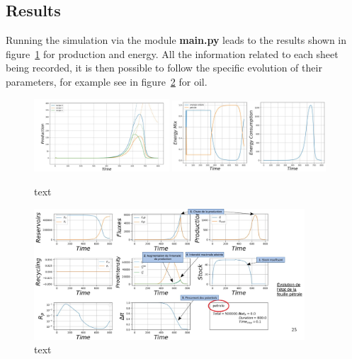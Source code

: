 \documentclass[12pt,a4paper]{article}%
\begin{document}

\subsection{Results}

Running the simulation via the module \textbf{main.py} leads to the results shown in figure~\ref{fig:ResSimulProd} for production and energy. All the information related to each sheet being recorded, it is then possible to follow the specific evolution of their parameters, for example see in figure~\ref{fig:ResSimulOil} for oil.



\begin{figure}[h]
	\centering
	\includegraphics[width=0.45\textwidth]{figures/ResultatSimul.jpg}
	\includegraphics[width=0.51\textwidth]{figures/ResultatSimulE.png}
	\caption{text}
	\label{fig:ResSimulProd}
\end{figure}



\begin{figure}[h]
	\centering
	\includegraphics[width=0.9\textwidth]{figures/ResultatSimulPet.jpg}
	\caption{text}
	\label{fig:ResSimulOil}
\end{figure}
\end{document}
